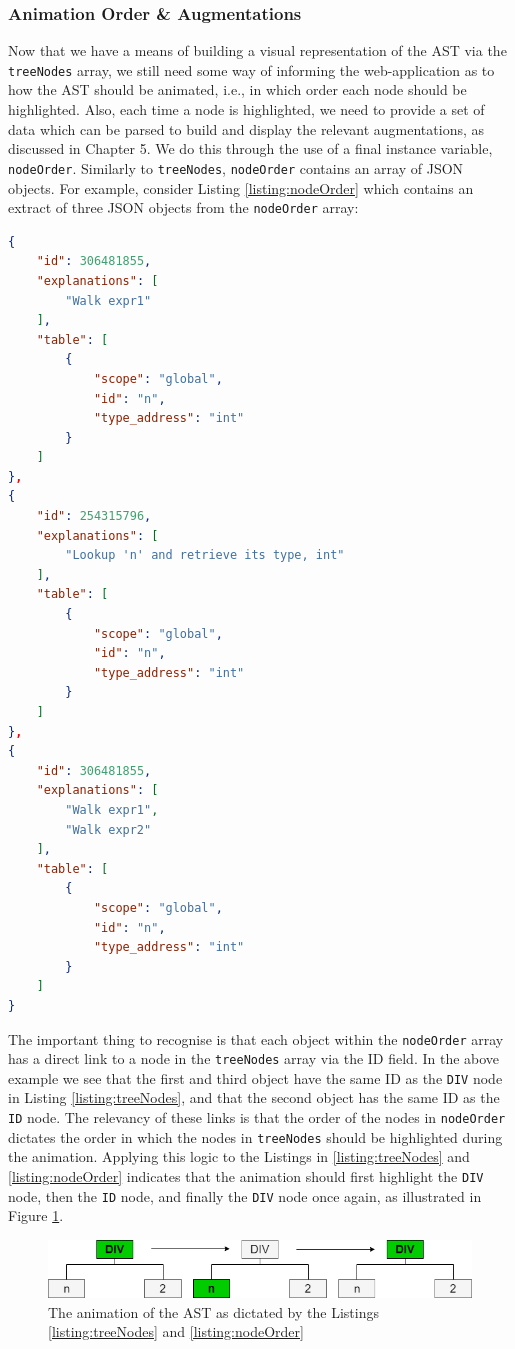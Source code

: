 \documentclass{l4proj}
\begin{document}
\subsubsection{Animation Order \& Augmentations}
Now that we have a means of building a visual representation of the AST via the \texttt{treeNodes} array, we still need some way of informing the web-application as to how the AST should be animated, i.e., in which order each node should be highlighted. Also, each time a node is highlighted, we need to provide a set of data which can be parsed to build and display the relevant augmentations, as discussed in Chapter 5. We do this through the use of a final instance variable, \texttt{nodeOrder}. Similarly to \texttt{treeNodes}, \texttt{nodeOrder} contains an array of JSON objects. For example, consider Listing \ref{listing:nodeOrder} which contains an extract of three JSON objects from the \texttt{nodeOrder} array:
\begin{lstlisting}[language=json,caption=Extract from the \texttt{nodeOrder} array,label=listing:nodeOrder]
{
	"id": 306481855,
	"explanations": [
		"Walk expr1"
	],
	"table": [
		{
			"scope": "global",
			"id": "n",
			"type_address": "int"
		}
	]
},
{
	"id": 254315796,
	"explanations": [
		"Lookup 'n' and retrieve its type, int"
	],
	"table": [
		{
			"scope": "global",
			"id": "n",
			"type_address": "int"
		}
	]
},
{
	"id": 306481855,
	"explanations": [
		"Walk expr1",
		"Walk expr2"
	],
	"table": [
		{
			"scope": "global",
			"id": "n",
			"type_address": "int"
		}
	]
}
 \end{lstlisting}

The important thing to recognise is that each object within the \texttt{nodeOrder} array has a direct link to a node in the \texttt{treeNodes} array via the ID field. In the above example we see that the first and third object have the same ID as the \texttt{DIV} node in Listing \ref{listing:treeNodes}, and that the second object has the same ID as the \texttt{ID} node. The relevancy of these links is that the order of the nodes in \texttt{nodeOrder} dictates the order in which the nodes in \texttt{treeNodes} should be highlighted during the animation. Applying this logic to the Listings in \ref{listing:treeNodes} and \ref{listing:nodeOrder} indicates that the animation should first highlight the \texttt{DIV} node, then the \texttt{ID} node, and finally the \texttt{DIV} node once again, as illustrated in Figure \ref{fig:animOrder}.
\begin{figure}[h]
\centering
\includegraphics[scale=0.6]{images/animOrder.png}
\caption{The animation of the AST as dictated by the Listings \ref{listing:treeNodes} and \ref{listing:nodeOrder}}
\label{fig:animOrder}	
\end{figure}
\end{document}
